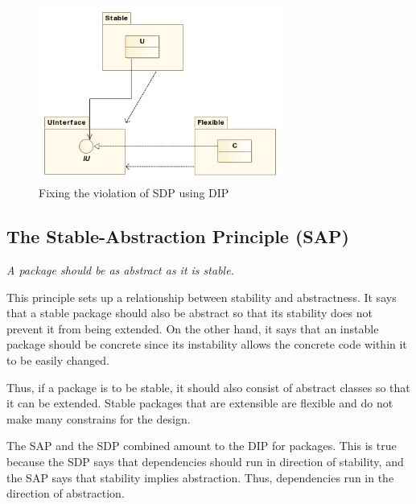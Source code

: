 \documentclass[12pt]{report}
\newcommand\tab[1][1cm]{\hspace*{#1}}
\begin{document}
\begin{figure}[H]
    \centering
    \includegraphics[width=8cm]{uml/fix-using-dip.png}
    \caption{Fixing the violation of SDP using DIP}
    \label{FixUsingSDP}
\end{figure}


\subsection{The Stable-Abstraction Principle (SAP)}

\tab \textit{A package should be as abstract as it is stable.} \cite{agile}

This principle sets up a relationship between 
stability and abstractness. It says that a stable package should also be
abstract so that its stability does not prevent it from being extended. 
On the other hand, it says that an instable
package should be concrete since its instability 
allows the concrete code within it to be easily changed.

Thus, if a package is to be stable, it should also consist of 
abstract classes so that it can be extended. 
Stable packages that are extensible are flexible and do not make many  
constrains for the design.

The SAP and the SDP combined amount to the DIP for packages. 
This is true because the SDP says that dependencies should run in direction
of stability, and the SAP says that stability implies abstraction. Thus, 
dependencies run in the direction of abstraction. 


{}

\end{document}
